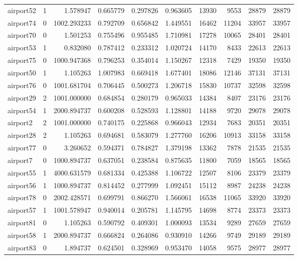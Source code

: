 \begin{longtable}{|l|r|r|r|r|r|r|r|r|r|}
airport52 & 1 & 1.578947 & 0.665779 & 0.297826 & 0.963605 & 13930 & 9553 & 28879 & 28879 \\
airport74 & 0 & 1002.293233 & 0.792709 & 0.656842 & 1.449551 & 16462 & 11204 & 33957 & 33957 \\
airport70 & 0 & 1.501253 & 0.755496 & 0.955485 & 1.710981 & 17278 & 10065 & 28401 & 28401 \\
airport53 & 1 & 0.832080 & 0.787412 & 0.233312 & 1.020724 & 14170 & 8433 & 22613 & 22613 \\
airport75 & 0 & 1000.947368 & 0.796253 & 0.354014 & 1.150267 & 12318 & 7429 & 19350 & 19350 \\
airport50 & 1 & 1.105263 & 1.007983 & 0.669418 & 1.677401 & 18086 & 12146 & 37131 & 37131 \\
airport76 & 0 & 1001.681704 & 0.706445 & 0.500273 & 1.206718 & 15830 & 10737 & 32598 & 32598 \\
airport29 & 2 & 1001.000000 & 0.684854 & 0.280179 & 0.965033 & 14384 & 8407 & 23176 & 23176 \\
airport54 & 1 & 2000.894737 & 0.600208 & 0.528593 & 1.128801 & 14188 & 9720 & 29078 & 29078 \\
airport2 & 2 & 1001.000000 & 0.740175 & 0.225868 & 0.966043 & 12934 & 7683 & 20351 & 20351 \\
airport28 & 2 & 1.105263 & 0.694681 & 0.583079 & 1.277760 & 16206 & 10913 & 33158 & 33158 \\
airport77 & 0 & 3.260652 & 0.594371 & 0.784827 & 1.379198 & 13362 & 7878 & 21535 & 21535 \\
airport7 & 0 & 1000.894737 & 0.637051 & 0.238584 & 0.875635 & 11800 & 7059 & 18565 & 18565 \\
airport55 & 1 & 4000.631579 & 0.681334 & 0.425388 & 1.106722 & 12507 & 8106 & 23379 & 23379 \\
airport56 & 1 & 1000.894737 & 0.814452 & 0.277999 & 1.092451 & 15112 & 8987 & 24238 & 24238 \\
airport78 & 0 & 2002.428571 & 0.699791 & 0.866270 & 1.566061 & 16538 & 11065 & 33920 & 33920 \\
airport57 & 1 & 1001.578947 & 0.940014 & 0.205781 & 1.145795 & 14698 & 8774 & 23373 & 23373 \\
airport81 & 0 & 1.105263 & 0.590792 & 0.409301 & 1.000093 & 13534 & 9289 & 27659 & 27659 \\
airport58 & 1 & 2000.894737 & 0.666824 & 0.264086 & 0.930910 & 14266 & 9749 & 29189 & 29189 \\
airport83 & 0 & 1.894737 & 0.624501 & 0.328969 & 0.953470 & 14058 & 9575 & 28977 & 28977 \\

\end{longtable}
